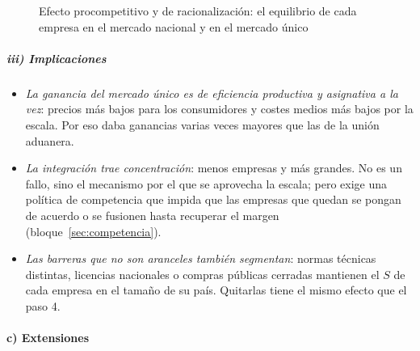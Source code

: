 \documentclass[11pt]{article}
\begin{document}
\begin{figure}[H]
\centering
\caption{Efecto procompetitivo y de racionalización: el equilibrio de cada empresa en el mercado nacional y en el mercado único}\label{fig:mercado-integrado}
\end{figure}

\subparagraph{iii) Implicaciones}

\begin{itemize}
\item \emph{La ganancia del mercado único es de eficiencia productiva y asignativa a la vez}: precios más bajos para los consumidores y costes medios más bajos por la escala. Por eso  daba ganancias varias veces mayores que las de la unión aduanera.
\item \emph{La integración trae concentración}: menos empresas y más grandes. No es un fallo, sino el mecanismo por el que se aprovecha la escala; pero exige una política de competencia que impida que las empresas que quedan se pongan de acuerdo o se fusionen hasta recuperar el margen (bloque~\ref{sec:competencia}).
\item \emph{Las barreras que no son aranceles también segmentan}: normas técnicas distintas, licencias nacionales o compras públicas cerradas mantienen el $S$ de cada empresa en el tamaño de su país. Quitarlas tiene el mismo efecto que el paso 4.
\end{itemize}

\paragraph{c) Extensiones}
\end{document}
